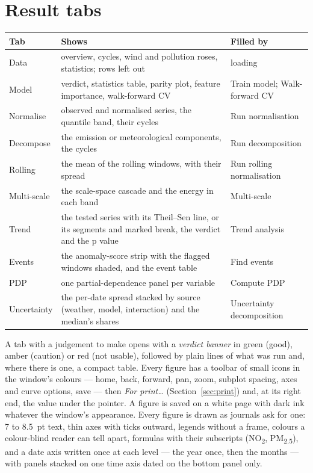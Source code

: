\documentclass[11pt]{report}
\newcommand{\NOtwo}{NO\textsubscript{2}}
\newcommand{\PMtwo}{PM\textsubscript{2.5}}
\begin{document}
\section{Result tabs}
\begin{center}\small
\begin{tabular}{@{}lll@{}}
\toprule
Tab & Shows & Filled by \\
\midrule
Data        & overview, cycles, wind and pollution roses, statistics; rows left out & loading \\
Model       & verdict, statistics table, parity plot, feature importance, walk-forward CV & Train model; Walk-forward CV \\
Normalise   & observed and normalised series, the quantile band, their cycles & Run normalisation \\
Decompose   & the emission or meteorological components, the cycles & Run decomposition \\
Rolling     & the mean of the rolling windows, with their spread & Run rolling normalisation \\
Multi-scale & the scale-space cascade and the energy in each band & Multi-scale \\
Trend       & the tested series with its Theil--Sen line, or its segments and marked break, the verdict and the p value & Trend analysis \\
Events      & the anomaly-score strip with the flagged windows shaded, and the event table & Find events \\
PDP         & one partial-dependence panel per variable & Compute PDP \\
Uncertainty & the per-date spread stacked by source (weather, model, interaction) and the median's shares & Uncertainty decomposition \\
\bottomrule
\end{tabular}
\end{center}
A tab with a judgement to make opens with a \emph{verdict banner} in green (good), amber
(caution) or red (not usable), followed by plain lines of what was run and, where there
is one, a compact table. Every figure has a toolbar of small icons in the window's
colours --- home, back, forward, pan, zoom, subplot spacing, axes and curve options,
save --- then \emph{For print\ldots} (Section~\ref{sec:print}) and, at its right end, the
value under the pointer. A figure is saved on a white page with dark ink whatever the
window's appearance. Every figure is drawn as journals ask for one: 7 to 8.5~pt text, thin
axes with ticks outward, legends without a frame, colours a colour-blind reader can tell
apart, formulas with their subscripts (\NOtwo{}, \PMtwo{}), and a date axis written once
at each level --- the year once, then the months --- with panels stacked on one time axis
dated on the bottom panel only.
\end{document}

